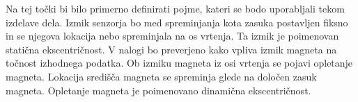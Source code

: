 Na tej točki bi bilo primerno definirati pojme, kateri se bodo uporabljali tekom izdelave dela.
Izmik senzorja bo med spreminjanja kota zasuka postavljen fiksno in se njegova lokacija nebo spreminjala na os vrtenja. Ta izmik je poimenovan statična ekscentričnost.
V nalogi bo preverjeno kako vpliva izmik magneta na točnost izhodnega podatka. Ob izmiku magneta iz osi vrtenja se pojavi opletanje magneta. Lokacija središča magneta se spreminja glede na določen zasuk magneta. Opletanje magneta je poimenovano dinamična ekscentričnost.














%
%
%
%
%
